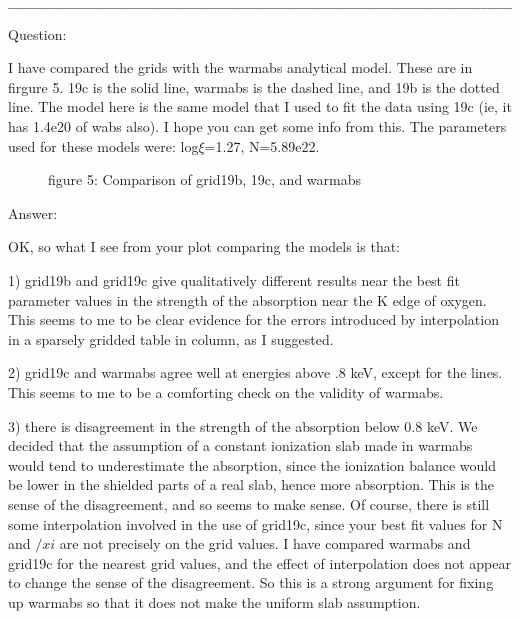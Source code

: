 \begin{verbatim}
_________________________________________________________________________________
\end{verbatim}

Question:

I have compared the grids with the warmabs analytical model. These are in 
firgure 5. 19c is the solid line, warmabs is the dashed line, and 19b 
is the dotted line. The model here is the same model that I used to fit 
the data using 19c (ie, it has 1.4e20 of wabs also). I hope you can get 
some info from this. The parameters used for these models were: log$\xi$=1.27, 
N=5.89e22.

\begin{figure}
\epsfxsize=5.6in  %
\epsfysize=7.0in  %
\caption{figure 5: Comparison of grid19b, 19c, and warmabs}
\label{fig:Comparison of grid19b, 19c, and warmabs}
\end{figure}

Answer:

OK, so what I see from your plot comparing the models is that:

1) grid19b and grid19c give qualitatively different results near the best 
fit parameter values in the strength of the absorption near the K edge of 
oxygen.  This seems to me to be clear evidence for the errors introduced 
by interpolation in a sparsely gridded table in column, as I suggested. 

2) grid19c and warmabs agree well at energies above .8 keV, except for the 
lines.  This seems to me to be a comforting check on the validity of 
warmabs.  

3) there is disagreement in the strength of the absorption below 0.8 keV.  
We decided that the assumption of a constant ionization slab made in 
warmabs would tend to underestimate the absorption, since the ionization 
balance would be lower in the shielded parts of a real slab, hence more 
absorption.  This is the sense of the disagreement, and so seems to make 
sense.  Of course, there is still some interpolation involved in the use 
of grid19c, since your best fit values for N and $/xi$ are not precisely on 
the grid values.  I have compared warmabs and grid19c for the nearest grid 
values, and the effect of interpolation does not appear to change the 
sense of the disagreement.  So this is a strong argument for fixing up 
warmabs so that it does not make the uniform slab assumption.

